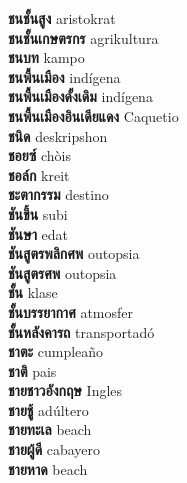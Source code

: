 \textbf{ ชนชั้นสูง  } aristokrat \\
\textbf{ ชนชั้นเกษตรกร  } agrikultura \\
\textbf{ ชนบท  } kampo \\
\textbf{ ชนพื้นเมือง  } indígena \\
\textbf{ ชนพื้นเมืองดั้งเดิม  } indígena \\
\textbf{ ชนพื้นเมืองอินเดียแดง  } Caquetio \\
\textbf{ ชนิด  } deskripshon \\
\textbf{ ชอยซ์  } chòis \\
\textbf{ ชอล์ก  } kreit \\
\textbf{ ชะตากรรม  } destino \\
\textbf{ ชันขึ้น  } subi \\
\textbf{ ชันษา  } edat \\
\textbf{ ชันสูตรพลิกศพ  } outopsia \\
\textbf{ ชันสูตรศพ  } outopsia \\
\textbf{ ชั้น  } klase \\
\textbf{ ชั้นบรรยากาศ  } atmosfer \\
\textbf{ ชั้นหลังคารถ  } transportadó \\
\textbf{ ชาตะ  } cumpleaño \\
\textbf{ ชาติ  } pais \\
\textbf{ ชายชาวอังกฤษ  } Ingles \\
\textbf{ ชายชู้  } adúltero \\
\textbf{ ชายทะเล  } beach \\
\textbf{ ชายผู้ดี  } cabayero \\
\textbf{ ชายหาด  } beach \\
